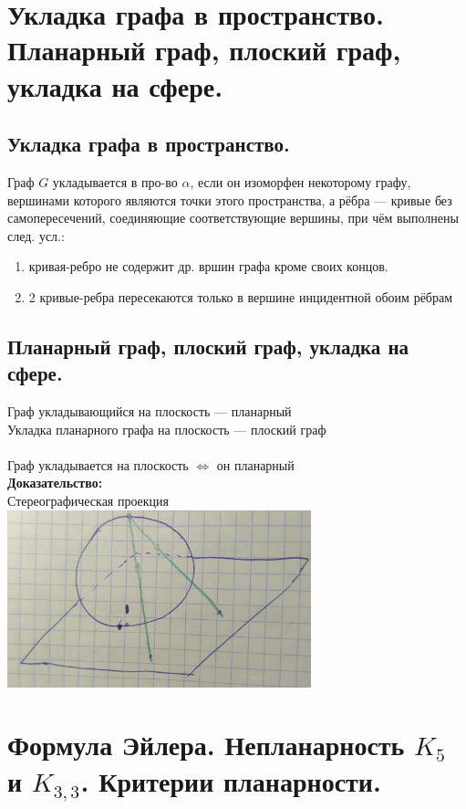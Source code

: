 \documentclass[12pt]{article}
\begin{document}
\section{Укладка графа в пространство. Планарный граф, плоский граф, укладка на сфере.}
	\subsection{Укладка графа в пространство.}
		Граф $G$ укладывается в про-во $\alpha$, если он изоморфен некоторому графу, вершинами которого являются точки этого пространства, а рёбра — кривые без самопересечений, соединяющие соответствующие вершины, при чём выполнены след. усл.:
		\begin{enumerate}
			\item кривая-ребро не содержит др. вршин графа кроме своих концов.
			\item 2 кривые-ребра пересекаются только в вершине инцидентной обоим рёбрам
		\end{enumerate}
	\subsection{Планарный граф, плоский граф, укладка на сфере.}
		Граф укладывающийся на плоскость — планарный\\
		Укладка планарного графа на плоскость — плоский граф\\\\
		Граф укладывается на плоскость $\Leftrightarrow$ он планарный\\
		\textbf{Доказательство:}\\
			Стереографическая проекция\\
			\includegraphics[width=250pt]{5}\\
		\qedsymbol

\section{Формула Эйлера. Непланарность $K_5$ и $K_{3,3}$. Критерии планарности.}
\end{document}
